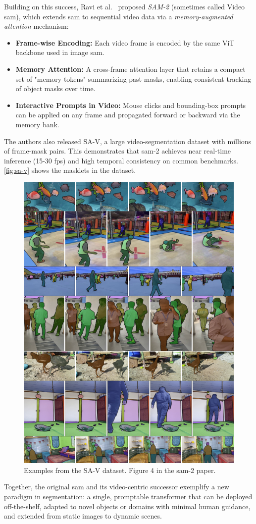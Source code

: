 Building on this success, Ravi et al.\ \cite{ravi_sam_nodate} proposed \emph{SAM-2} (sometimes called Video \acrshort{sam}), which extends \acrshort{sam} to sequential video data via a \emph{memory-augmented attention} mechanism:
\begin{itemize}
    \item \textbf{Frame-wise Encoding:} Each video frame is encoded by the same ViT backbone used in image \acrshort{sam}.
    \item \textbf{Memory Attention:} A cross-frame attention layer that retains a compact set of "memory tokens" summarizing past masks, enabling consistent tracking of object masks over time.
    \item \textbf{Interactive Prompts in Video:} Mouse clicks and bounding-box prompts can be applied on any frame and propagated forward or backward via the memory bank.
\end{itemize}
The authors also released SA-V, a large video-segmentation dataset with millions of frame-mask pairs. This demonstrates that \acrshort{sam}-2 achieves near real-time inference (15-30 fps) and high temporal consistency on common benchmarks. \autoref{fig:sa-v} shows the masklets in the dataset. 
\begin{figure}
    \centering
    \includegraphics[width=0.5\linewidth]{figures/sam_2.png}
    \caption{Examples from the SA-V dataset. Figure 4 in the \acrshort{sam}-2 paper\cite{ravi_sam_nodate}.}
    \label{fig:sa-v}
\end{figure}

Together, the original \acrshort{sam} and its video-centric successor exemplify a new paradigm in segmentation: a single, promptable transformer that can be deployed off-the-shelf, adapted to novel objects or domains with minimal human guidance, and extended from static images to dynamic scenes. 

